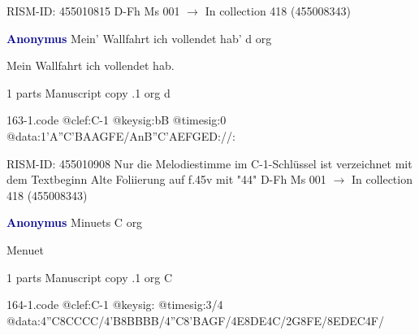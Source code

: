 \documentclass[twocolumn]{book}
\begin{document}
\newline RISM-ID: 455010815
\newline D-Fh  Ms 001
\newline $\rightarrow$ In collection 418 (455008343)

\newline \par \vspace{7pt} \textcolor{darkblue}{\textbf{Anonymus  }}
\newline Mein' Wallfahrt ich vollendet hab'  d  
\newline org
\newline \begin{itshape}[f.45v, at left:] Mein Wallfahrt ich vollendet hab.\end{itshape} 
\newline \textcolor{darkblue}{}  1 parts  
\newline Manuscript copy
.1  org  d  
\begin{filecontents*}{163-1.code}
@clef:C-1
@keysig:bB
@timesig:0
@data:1'A''C'BAAGFE/AnB''C'AEFGED://:
\end{filecontents*}
\newline
%

\newline RISM-ID: 455010908
\newline Nur die Melodiestimme im C-1-Schlüssel ist verzeichnet mit dem Textbeginn
\newline Alte Foliierung auf f.45v mit "44"
\newline D-Fh  Ms 001
\newline $\rightarrow$ In collection 418 (455008343)

\newline \par \vspace{7pt} \textcolor{darkblue}{\textbf{Anonymus  }}
\newline Minuets  C  
\newline org
\newline \begin{itshape}[f.116v, heading:] Menuet\end{itshape} 
\newline \textcolor{darkblue}{}  1 parts  
\newline Manuscript copy
.1  org  C  
\begin{filecontents*}{164-1.code}
@clef:C-1
@keysig:
@timesig:3/4
@data:4''C{8CCCC}/4'B{8BBBB}/4''C{8'BAGF}/4E{8DE}4C/2G{8FE}/{8EDEC}4F/
\end{filecontents*}
\newline
%
\end{document}
